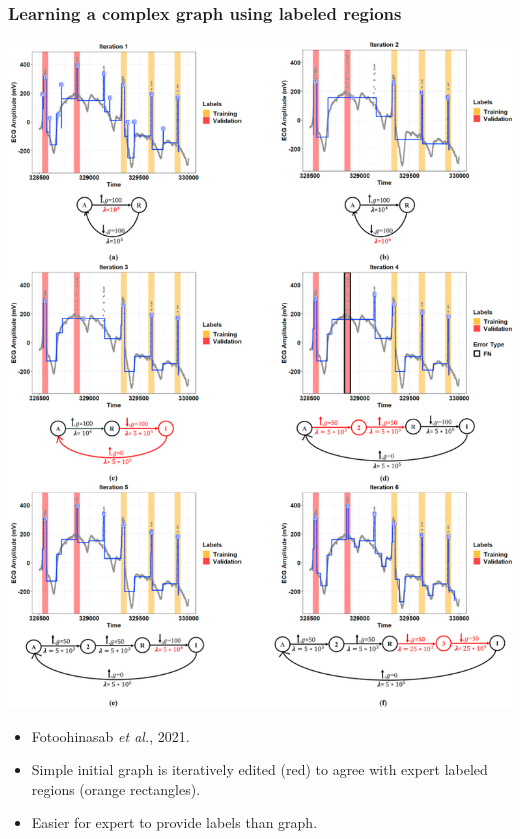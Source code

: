 \documentclass{beamer}
\begin{document}
\begin{frame}
  \frametitle{Learning a complex graph using labeled regions}
\parbox{0.6\textwidth}{
  \includegraphics[width=\linewidth]{gfpop-ecg-iterations}
} \parbox{0.35\textwidth}{
  \begin{itemize}
  \item  Fotoohinasab \emph{et al.}, 2021.
\item Simple initial graph is iteratively edited (red) to agree with expert
 labeled regions (orange rectangles).
\item Easier for expert to provide labels than graph.
  \end{itemize}
 }
\end{frame}
\end{document}
